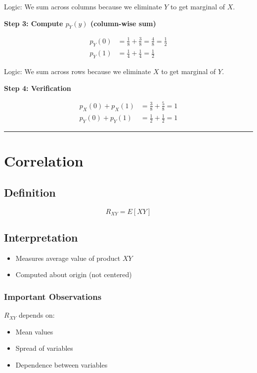 \documentclass[12pt]{article}
\begin{document}
Logic: We sum across columns because we eliminate $Y$ to get marginal of $X$.

\textbf{Step 3: Compute $p_Y(y)$ (column-wise sum)}

\begin{align*}
p_Y(0) &= \frac{1}{8} + \frac{3}{8} = \frac{4}{8} = \frac{1}{2} \\
p_Y(1) &= \frac{1}{4} + \frac{1}{4} = \frac{1}{2}
\end{align*}

Logic: We sum across rows because we eliminate $X$ to get marginal of $Y$.

\textbf{Step 4: Verification}

\begin{align*}
p_X(0) + p_X(1) &= \frac{3}{8} + \frac{5}{8} = 1 \\
p_Y(0) + p_Y(1) &= \frac{1}{2} + \frac{1}{2} = 1
\end{align*}

\hrule
\vspace{0.5cm}

\section{Correlation}

\subsection{Definition}

\[
R_{XY} = E[XY]
\]

\subsection{Interpretation}

\begin{itemize}
\item Measures average value of product $XY$
\item Computed about origin (not centered)
\end{itemize}

\subsubsection*{Important Observations}

$R_{XY}$ depends on:

\begin{itemize}
\item Mean values
\item Spread of variables
\item Dependence between variables
\end{itemize}
\end{document}
